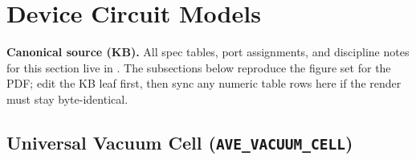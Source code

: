 
\section{Device Circuit Models}
\label{sec:vol9_device_circuit_models}

\noindent\textbf{Canonical source (KB).} All spec tables, port assignments, and discipline notes for this section live in . The subsections below reproduce the figure set for the PDF; edit the KB leaf first, then sync any numeric table rows here if the render must stay byte-identical.

\subsection{Universal Vacuum Cell (\texttt{AVE\_VACUUM\_CELL})}
\label{sec:vol9_ave_vacuum_cell_circuit}



